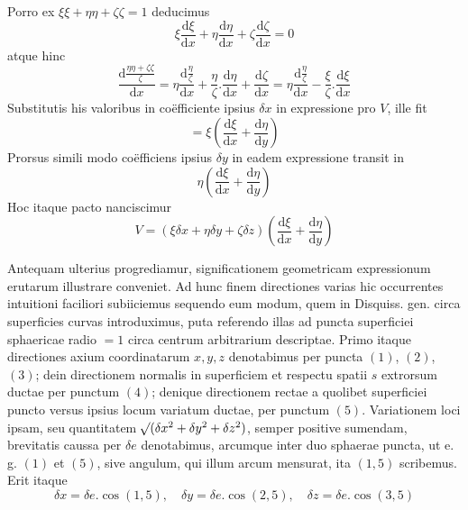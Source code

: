Porro ex $\xi\xi+\eta\eta+\zeta\zeta=1$ deducimus
\[
\xi\frac{\mathrm{d}\xi}{\mathrm{d}x}+\eta\frac{\mathrm{d}\eta}{\mathrm{d}x}+\zeta\frac{\mathrm{d}\zeta}{\mathrm{d}x}=0
\]
atque hinc
\[
\frac{\mathrm{d}\frac{\eta\eta+\zeta\zeta}{\zeta}}{\mathrm{d}x}=\eta\frac{\mathrm{d}\frac{\eta}{\zeta}}{\mathrm{d}x}+\frac{\eta}{\zeta}.\frac{\mathrm{d}\eta}{\mathrm{d}x}+\frac{\mathrm{d}\zeta}{\mathrm{d}x}=\eta\frac{\mathrm{d}\frac{\eta}{\zeta}}{\mathrm{d}x}-\frac{\xi}{\zeta}.\frac{\mathrm{d}\xi}{\mathrm{d}x}
\]
Substitutis his valoribus in coëfficiente ipsius $\delta x$ in expressione pro $V$, ille fit
\[
=\xi(\frac{\mathrm{d}\xi}{\mathrm{d}x}+\frac{\mathrm{d}\eta}{\mathrm{d}y})
\]
Prorsus simili modo coëfficiens ipsius $\delta y$ in eadem expressione transit in
\[
\eta(\frac{\mathrm{d}\xi}{\mathrm{d}x}+\frac{\mathrm{d}\eta}{\mathrm{d}y})
\]
Hoc itaque pacto nanciscimur
\[
V=(\xi\delta x+\eta\delta y+\zeta\delta z)(\frac{\mathrm{d}\xi}{\mathrm{d}x}+\frac{\mathrm{d}\eta}{\mathrm{d}y})
\]

Antequam ulterius progrediamur, significationem geometricam expressionum erutarum illustrare conveniet. Ad hunc finem directiones varias hic occurrentes intuitioni faciliori subiiciemus sequendo eum modum, quem in Disquiss. gen. circa superficies curvas introduximus, puta referendo illas ad puncta superficiei sphaericae radio $=1$ circa centrum arbitrarium descriptae. Primo itaque directiones axium coordinatarum $x,y,z$ denotabimus per puncta $(1)$, $(2)$, $(3)$; dein directionem normalis in superficiem et respectu spatii $s$ extrorsum ductae per punctum $(4)$; denique directionem rectae a quolibet superficiei puncto versus ipsius locum variatum ductae, per punctum $(5)$. Variationem loci ipsam, seu quantitatem $\mathord{{}^{}\!\surd}(\delta x^2+\delta y^2+\delta z^2)$, semper positive sumendam, brevitatis caussa per $\delta e$ denotabimus, arcumque inter duo sphaerae puncta, ut e. g. $(1)$ et $(5)$, sive angulum, qui illum arcum mensurat, ita $(1,5)$ scribemus. Erit itaque
\[
\delta x=\delta e.\cos(1,5),\quad \delta y=\delta e.\cos(2,5),\quad \delta z=\delta e.\cos(3,5)
\]

